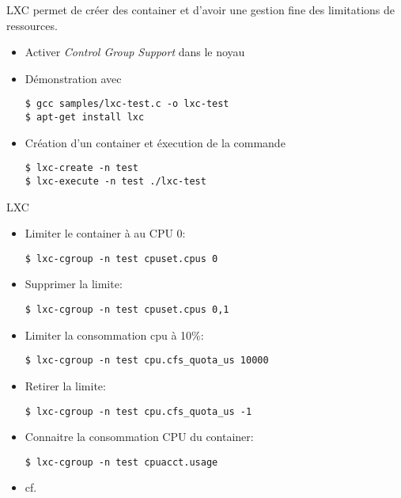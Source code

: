 \begin{frame}[fragile=singleslide]{LXC}
   permet de créer des  container et d'avoir une gestion fine
  des limitations de ressources.
  \begin{itemize}
  \item Activer \emph{Control Group Support} dans le noyau
  \item Démonstration avec 
    \begin{lstlisting}
$ gcc samples/lxc-test.c -o lxc-test
$ apt-get install lxc
    \end{lstlisting}
  \item Création d'un container et éxecution de la commande
    \begin{lstlisting}
$ lxc-create -n test
$ lxc-execute -n test ./lxc-test
    \end{lstlisting}
  \end{itemize}
\end{frame}

\begin{frame}[fragile=singleslide]{LXC}
  \begin{itemize} 
  \item Limiter le container à au CPU 0:
    \begin{lstlisting}
$ lxc-cgroup -n test cpuset.cpus 0
    \end{lstlisting}
  \item Supprimer la limite:
    \begin{lstlisting}
$ lxc-cgroup -n test cpuset.cpus 0,1
    \end{lstlisting}
  \item Limiter la consommation cpu à 10\%:
    \begin{lstlisting}
$ lxc-cgroup -n test cpu.cfs_quota_us 10000
    \end{lstlisting}
  \item Retirer la limite:
    \begin{lstlisting}
$ lxc-cgroup -n test cpu.cfs_quota_us -1
    \end{lstlisting}
  \item Connaitre la consommation CPU du container:
    \begin{lstlisting}
$ lxc-cgroup -n test cpuacct.usage
    \end{lstlisting}
  \item cf. 
  \end{itemize}
\end{frame}

